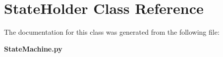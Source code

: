 \section{State\-Holder Class Reference}
\label{classStateHolder}


The documentation for this class was generated from the following file:\begin{CompactItemize}
\item 
{\bf State\-Machine.py}\end{CompactItemize}
